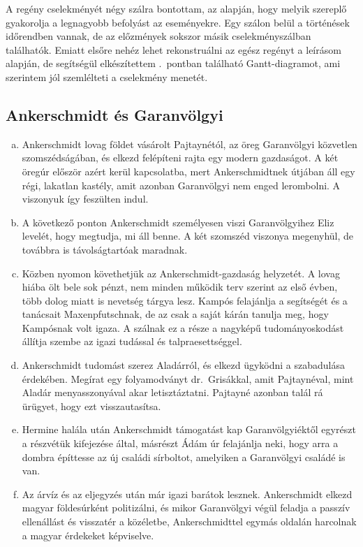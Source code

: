 \documentclass{thesis-ekf}
\theoremstyle{definition}
\begin{document}
    A regény cselekményét négy szálra bontottam, az alapján, hogy melyik szereplő gyakorolja a legnagyobb befolyást az eseményekre.
    Egy szálon belül a történések időrendben vannak, de az előzmények sokszor másik cselekményszálban találhatók.
    Emiatt elsőre nehéz lehet rekonstruálni az egész regényt a leírásom alapján, de segítségül elkészítettem
        .~pontban található Gantt-diagramot, ami szerintem jól szemlélteti a cselekmény menetét.

    \subsection{Ankerschmidt és Garanvölgyi}

    \begin{enumerate}[a)]
        \item\label{itm:bekoltoznek} Ankerschmidt lovag földet vásárolt Pajtaynétól, az öreg Garanvölgyi közvetlen szomszédságában,
            és elkezd felépíteni rajta egy modern gazdaságot.
        A két öregúr először azért kerül kapcsolatba, mert Ankerschmidtnek útjában áll egy régi, lakatlan kastély,
            amit azonban Garanvölgyi nem enged lerombolni.
        A viszonyuk így feszülten indul.
        \item\label{itm:Eliz-levele} A következő ponton Ankerschmidt személyesen viszi Garanvölgyihez Eliz levelét, hogy megtudja, mi áll benne.
        A két szomszéd viszonya megenyhül, de továbbra is távolságtartóak maradnak.
        \item\label{itm:gazdasag} Közben nyomon követhetjük az Ankerschmidt-gazdaság helyzetét.
        A lovag hiába ölt bele sok pénzt, nem minden működik terv szerint az első évben, több dolog miatt is nevetség tárgya lesz.
        Kampós felajánlja a segítségét és a tanácsait Maxenpfutschnak, de az csak a saját kárán tanulja meg, 
            hogy Kampósnak volt igaza.
        A szálnak ez a része a nagyképű tudományoskodást állítja szembe az igazi tudással és talpraesettséggel.
        \item\label{itm:Aladarert} Ankerschmidt tudomást szerez Aladárról, és elkezd ügyködni a szabadulása érdekében.
        Megírat egy folyamodványt dr.~Grisákkal, amit Pajtaynéval, mint Aladár menyasszonyával akar letisztáztatni.
        Pajtayné azonban talál rá ürügyet, hogy ezt visszautasítsa.
        \item\label{itm:sirbolt} Hermine halála után Ankerschmidt támogatást kap Garanvölgyiéktől egyrészt a részvétük kifejezése által,
            másrészt Ádám úr felajánlja neki, hogy arra a dombra építtesse az új családi sírboltot, 
            amelyiken a Garanvölgyi családé is van.
        \item\label{itm:politika} Az árvíz és az eljegyzés után már igazi barátok lesznek.
        Ankerschmidt elkezd magyar földesúrként politizálni, és mikor Garanvölgyi végül feladja a passzív ellenállást 
            és visszatér a közéletbe, Ankerschmidttel egymás oldalán harcolnak a magyar érdekeket képviselve.
    \end{enumerate}
    
\end{document}
